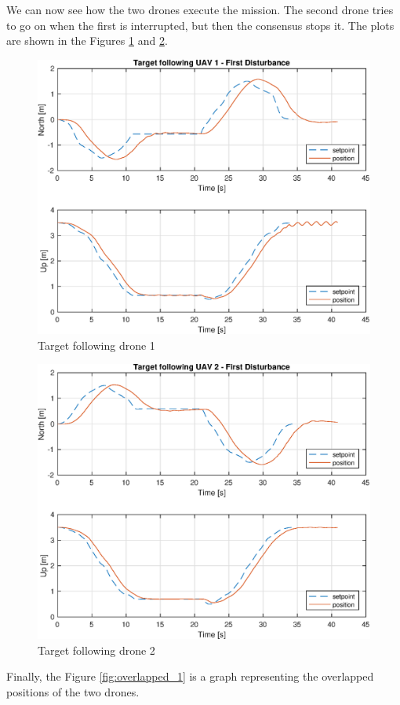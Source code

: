 We can now see how the two drones execute the mission. The second drone tries to
go on when the first is interrupted, but then the consensus stops it. The plots are
shown in the Figures \ref{fig:following_1_1} and \ref{fig:following_2_1}.

\begin{figure}
\centering
\includegraphics[width=0.7\linewidth]{chapters/chapter-04/figures/following_1_1.eps}
\caption{Target following drone 1}
\label{fig:following_1_1}
\end{figure}

\begin{figure}
\centering
\includegraphics[width=0.7\linewidth]{chapters/chapter-04/figures/following_2_1.eps}
\caption{Target following drone 2}
\label{fig:following_2_1}
\end{figure}

Finally, the Figure \ref{fig:overlapped_1} is a graph representing the overlapped
positions of the two drones.


